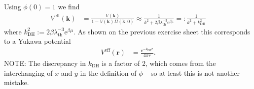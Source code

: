 \documentclass[english, parskip=full]{scrartcl}
\newcommand{\intx}{}
\newcommand{\intr}{}
\newcommand{\tecxt}{}
\newcommand{\e}{\text{e}}
\begin{document}
Using $\phi(0) = 1$ we find
\begin{align}
V^\tecxt\text{eff}(\textbf{k}) &= \frac{V(\textbf{k})}{1 - V(\textbf{k}) \Pi(\textbf{k},0) } \approx \frac{1}{k^2  + 2\beta \lambda_\mathrm{th}^{-3} \e^{\beta\mu} } =: \frac{1}{k^2 + k_\mathrm{DH}^2}
\end{align}
where $k_\mathrm{DH}^2 := 2\beta \lambda_\mathrm{th}^{-3} \e^{\beta\mu}$.
As shown on the previous exercise sheet this corresponds to a Yukawa potential
\begin{align}
V^\tecxt\text{eff} (\textbf{r}) &= \frac{\e^{-k_\tecxt\text{DH}r}}{4\pi r}.
\end{align}
NOTE: The discrepancy in $k_\tecxt\text{DH}$ is a factor of 2, which comes from the interchanging of $x$ and $y$ in the definition of $\phi$ -- so at least this is not another mistake.

\end{document}
